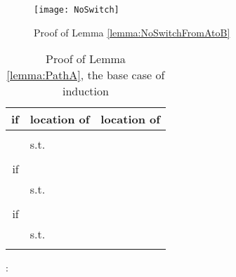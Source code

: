 \documentclass[a4paper,UKenglish]{lipics}
\begin{document}
\begin{figure}
	\centering
	\texttt{[image: NoSwitch]}
	\caption{Proof of Lemma \ref{lemma:NoSwitchFromAtoB}}
	\label{fig:noswitch}
\end{figure}





\begin{table}[h]
\centering
\begin{tabular}{ r | l | l  }
if    & location of  & location of   
 \\
\hline
    
&   &   \\
&  				  s.t.   & \\

&   & 	      \\

\hline
if  
&   &   \\
&  				  s.t.   & \\

&  &  \\

\hline
if  &  &   \\
&  				  s.t.   & \\
&  &  \\

\end{tabular}
\vspace{0.2 in}
\caption{Proof of Lemma \ref{lemma:PathA}, the base case of induction}
\label{tab:BaseCasePathA}
\end{table}







:
\end{document}

